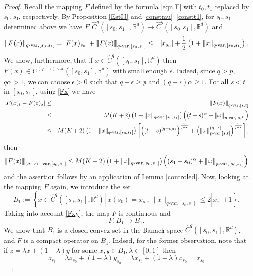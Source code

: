\documentclass[10pt]{article}
\numberwithin{equation}{section} %
\newcommand{\R}{\ensuremath{\mathbb{R}}}
\newcommand{\ltn}{\ensuremath{\left| \! \left| \! \left|}}
\newcommand{\rtn}{\ensuremath{\right| \! \right| \! \right|}}
\begin{document}
\begin{proof}
	Recall the mapping $F$ defined by the formula \eqref{eqn.F} with $t_0, t_1$ replaced by $s_0,s_1$, respectively. 	By Proposition \ref{EstIJ} and \eqref{constmu}--\eqref{constt1}, for $s_0, s_1$  determined above we have $F: \widehat{C}^{q}([s_0,s_1],\R^d)\longrightarrow  \widehat{C}^{q}([s_0,s_1],\R^d)$ and 
	\begin{eqnarray*}
	\|F(x)\|_{q\text{-var},[s_0,s_1]}= |F(x)_{s_0}|+\ltn F(x)\rtn_{q\text{-var},[s_0,s_1]}&\leq&|x_{s_0}|+\frac{1}{2}\left(1+\|x\|_{q\text{-var},[s_0,s_1]}\right).
	\end{eqnarray*}
	We show, furthermore, that if $x\in \widehat{C}^{q}([s_0,s_1],\R^d)$ then $F(x)\in C^{(q-\epsilon)\text{-var}}([s_0,s_1],\R^d)$ with small enough $\epsilon$. 
	Indeed, since $q>p$, $q\alpha>1$, we can choose $\epsilon > 0$ such that $q-\epsilon\geq p$ and $(q-\epsilon)\alpha \geq 1$. For all $s<t$ in $[s_0,s_1]$, using \eqref{Fx} we have 
	\begin{eqnarray*}
	|F(x)_t-F(x)_s|&\leq& \ltn F(x)\rtn_{q\text{-var},[s,t]}\\
	&\leq & M(K+2)\left(1+\|x\|_{q\text{-var},[s_0,s_1]}\right) \left((t-s)^{\alpha}+\ltn\omega\rtn_{p\text{-var},[s,t]}\right)\\
	&\leq &M(K+2)\left(1+\|x\|_{q\text{-var},[s_0,s_1]}\right)\left[\left((t-s)^{(q-\epsilon)\alpha}\right)^{\frac{1}{q-\epsilon}}+\left(\ltn \omega\rtn_{p\text{-var},[s,t]}^{(q-\epsilon)}\right)^{\frac{1}{q-\epsilon}}\right],
		\end{eqnarray*}
		then
		\begin{eqnarray*}
		\ltn F(x)\rtn_{(q-\epsilon)-\text{var},[s_0,s_1]}\leq  M(K+2)\left(1+\|x\|_{q\text{-var},[s_0,s_1]}\right) \left((s_1-s_0)^{\alpha}+\ltn\omega\rtn_{p\text{-var},[s_0,s_1]}\right)\\
		\end{eqnarray*}
		and the assertion follows by an application of 
 Lemma \ref{controled}.
	Now, looking at the mapping $F$ again, we introduce the set
$$
	B_1:= \left\{x\in \widehat{C}^{q}([s_0,s_1],\R^d)|\;x(s_0) = x_{s_0}, \|x\|_{q\text{-var},[s_0,s_1]}\leq 2|x_{s_0}|+1 \right\}.
$$
	 Taking into account \eqref{Fxy}, the map $F$ is continuous and  
	 $$	 
	 F:B_1 \to B_1.	 
	 $$
	We show that $B_1$ is a closed convex set in the Banach space $\widehat{C}^{q}([s_0,s_1],\R^d)$,  and $F$ is a compact operator on $B_1$. Indeed, for the former observation, note that if $z=\lambda x+(1-\lambda)y$ for some $x,y\in B_1, \lambda\in [0,1]$ then
	$$
z_{s_0} = \lambda x_{s_0}+(1-\lambda)y_{s_0}= \lambda x_{s_0}+(1-\lambda)x_{s_0} = x_{s_0}
$$
\end{proof}
\end{document}
